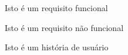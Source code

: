 \begin{siglas}
  \item[RF] Isto é um requisito funcional
  \item[RNF] Isto é um requisito não funcional
  \item[HU] Isto é um história de usuário
\end{siglas}
